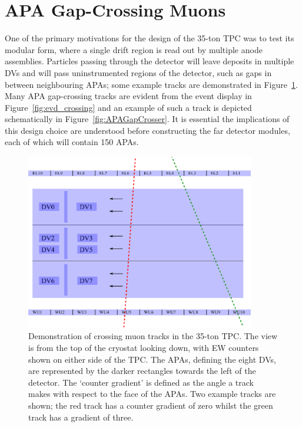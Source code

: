 \section{APA Gap-Crossing Muons}\label{sec:APAGapCrossing}

One of the primary motivations for the design of the 35-ton TPC was to test its modular form, where a single drift region is read out by multiple anode assemblies.  Particles passing through the detector will leave deposits in multiple DVs and will pass uninstrumented regions of the detector, such as gaps in between neighbouring APAs; some example tracks are demonstrated in Figure~\ref{fig:35tonCounters}.  Many APA gap-crossing tracks are evident from the event display in Figure~\ref{fig:evd_crossing} and an example of such a track is depicted schematically in Figure~\ref{fig:APAGapCrosser}.  It is essential the implications of this design choice are understood before constructing the far detector modules, each of which will contain 150 APAs.

\begin{figure}
  \centering
  \includegraphics[width=10cm]{CounterGradient.eps}
  \caption[Demonstration of crossing muons tracks in the 35-ton TPC.]{Demonstration of crossing muon tracks in the 35-ton TPC.  The view is from the top of the cryostat looking down, with EW counters shown on either side of the TPC.  The APAs, defining the eight DVs, are represented by the darker rectangles towards the left of the detector.  The `counter gradient' is defined as the angle a track makes with respect to the face of the APAs.  Two example tracks are shown; the red track has a counter gradient of zero whilst the green track has a gradient of three.}
  \label{fig:35tonCounters}
\end{figure}

